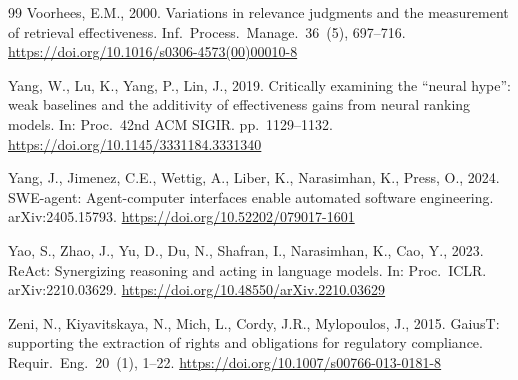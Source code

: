 \documentclass[a4paper,fleqn]{cas-sc}
\begin{document}
\begin{thebibliography}{99}
Voorhees, E.M., 2000. Variations in relevance judgments and the measurement of retrieval effectiveness. Inf.\ Process.\ Manage.\ 36~(5), 697--716. \url{https://doi.org/10.1016/s0306-4573(00)00010-8}

Yang, W., Lu, K., Yang, P., Lin, J., 2019. Critically examining the ``neural hype'': weak baselines and the additivity of effectiveness gains from neural ranking models. In: Proc.\ 42nd ACM SIGIR. pp.\ 1129--1132. \url{https://doi.org/10.1145/3331184.3331340}

Yang, J., Jimenez, C.E., Wettig, A., Liber, K., Narasimhan, K., Press, O., 2024. SWE-agent: Agent-computer interfaces enable automated software engineering. arXiv:2405.15793. \url{https://doi.org/10.52202/079017-1601}

Yao, S., Zhao, J., Yu, D., Du, N., Shafran, I., Narasimhan, K., Cao, Y., 2023. ReAct: Synergizing reasoning and acting in language models. In: Proc.\ ICLR. arXiv:2210.03629. \url{https://doi.org/10.48550/arXiv.2210.03629}

Zeni, N., Kiyavitskaya, N., Mich, L., Cordy, J.R., Mylopoulos, J., 2015. GaiusT: supporting the extraction of rights and obligations for regulatory compliance. Requir.\ Eng.\ 20~(1), 1--22. \url{https://doi.org/10.1007/s00766-013-0181-8}

\end{thebibliography}
\end{document}
